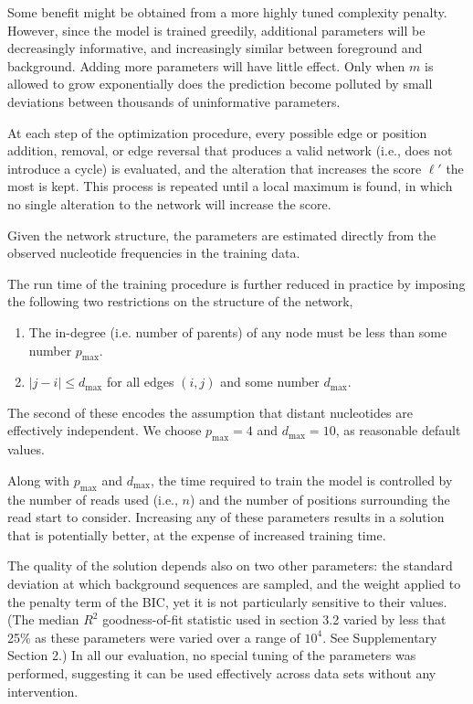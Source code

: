 \documentclass{bioinfo}
\begin{document}
Some benefit might be obtained from a more highly tuned complexity penalty.
However, since the model is trained greedily, additional parameters will be
decreasingly informative, and increasingly similar between foreground and
background. Adding more parameters will have little effect.  Only when $m$ is
allowed to grow exponentially does the prediction become polluted by small
deviations between thousands of uninformative parameters.

At each step of the optimization procedure, every possible edge or position
addition, removal, or edge reversal that produces a valid network (i.e., does not
introduce a cycle) is evaluated, and the alteration that increases the score
$\ell'$ the most is kept.  This process is repeated until a local maximum is
found, in which no single alteration to the network will increase the score.

Given the network structure, the parameters are estimated directly from the
observed nucleotide frequencies in the training data.

The run time of the training procedure is further reduced in practice by
imposing the following two restrictions on the structure of the network,
\begin{enumerate}
\item The in-degree (i.e. number of parents) of any node must be less than some
number $p_{\text{max}}$.
\item $|j - i| \le d_{\text{max}}$ for all edges $(i,j)$ and some number $d_{\text{max}}$.
\end{enumerate}
The second of these encodes the assumption that distant nucleotides are
effectively independent. We choose $p_{\text{max}} = 4$ and $d_{\text{max}} =
10$, as reasonable default values.

Along with $p_{\text{max}}$ and $d_{\text{max}}$, the time required to train the
model is controlled by the number of reads used (i.e., $n$) and the number of
positions surrounding the read start to consider. Increasing any of these
parameters results in a  solution that is potentially better, at
the expense of increased training time.

The quality of the solution depends also on two other parameters: the standard
deviation at which background sequences are sampled, and the weight applied to
the penalty term of the BIC, yet it is not particularly sensitive to their
values. (The median $R^2$ goodness-of-fit statistic used in section 3.2 varied
by less that 25\% as these parameters were varied over a range of $10^4$. See
Supplementary Section 2.) In all our evaluation, no special tuning of the
parameters was performed, suggesting it can be used effectively across data sets
without any intervention.
\end{document}
